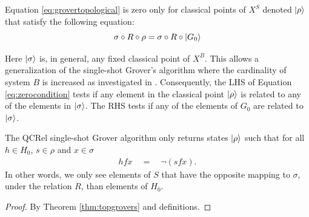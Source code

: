 \begin{theorem}
\label{thm:topgrovers}
Equation \ref{eq:grovertopological} is zero only for classical points of $X^S$ denoted $| \rho \rangle$ that satisfy the following equation:
\begin{equation}
\label{eq:zerocondition}
\sigma \circ R \circ \rho = \sigma \circ R \circ | G_0 \rangle
\end{equation}
\end{theorem}

Here $| \sigma \rangle$ is, in general, any fixed classical point of $X^B$. This allows a generalization of the single-shot Grover's algorithm where the cardinality of system $B$ is increased as investigated in \cite{vicary-tqa}.
Consequently, the LHS of Equation \ref{eq:zerocondition} tests if any element in the classical point $| \rho \rangle$ is related to any of the elements in $| \sigma \rangle$. The RHS tests if any of the elements of $G_0$ are related to $| \sigma \rangle$.

\begin{proposition}
The QCRel single-shot Grover algorithm only returns states $| \rho \rangle$ such that for all $h \in H_0$, $s\in\rho$ and $x\in \sigma$
\begin{align*}
h f x \quad = \quad \neg(s f x) .
\end{align*}
In other words, we only see elements of $S$ that have the opposite mapping to $\sigma$, under the relation $R$, than elements of $H_0$.
\end{proposition}
\begin{proof}
By Theorem \ref{thm:topgrovers} and definitions.
\end{proof}

